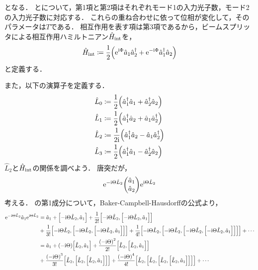 \documentclass{report}
\begin{document}
    となる．
    とについて，第1項と第2項はそれぞれモード1の入力光子数，モード2の入力光子数に対応する．
    これらの重ね合わせに依って位相が変化して，そのパラメータは$T$である．
    相互作用を表す項は第3項であるから，ビームスプリッタによる相互作用ハミルトニアン$\hat{H}_{\mathrm{int}}$を，
    \begin{align}
      \hat{H}_{\mathrm{int}} \coloneqq \frac{1}{2}\qty(\mathrm{e}^{\mathrm{i}\Phi}\hat{a}_1\hat{a}_2^{\dag} + \mathrm{e}^{-\mathrm{i}\Phi}\hat{a}_1^{\dag}\hat{a}_2)
    \end{align}
    と定義する．
    \par
    また，以下の演算子を定義する．
    \begin{align}
      \hat{L}_0 &\coloneqq \frac{1}{2}\qty(\hat{a}_1^{\dag}\hat{a}_1 + \hat{a}_2^{\dag}\hat{a}_2) \\ 
      \hat{L}_1 &\coloneqq \frac{1}{2}\qty(\hat{a}_1^{\dag}\hat{a}_2 + \hat{a}_1\hat{a}_2^{\dag}) \\ 
      \hat{L}_2 &\coloneqq \frac{1}{2\mathrm{i}}\qty(\hat{a}_1^{\dag}\hat{a}_2 - \hat{a}_1\hat{a}_2^{\dag}) \\ 
      \hat{L}_3 &\coloneqq \frac{1}{2}\qty(\hat{a}_1^{\dag}\hat{a}_1 - \hat{a}_2^{\dag}\hat{a}_2) 
    \end{align}
    $\hat{L}_2$と$\hat{H}_{\mathrm{int}}$の関係を調べよう．
    唐突だが，
    \begin{align}
      \e^{-\i\Theta\hat{L}_2}\mqty(\hat{a}_1 \\ \hat{a}_2)\e^{\i\Theta\hat{L}_2} \label{ml2a1a2ml2}
    \end{align}
    考える．
    の第1成分について，Baker-Campbell-Hausdorffの公式より，
    \begin{align}
      \mathrm{e}^{-\mathrm{i}\Theta\hat{L}_2}\hat{a}_1\mathrm{e}^{\mathrm{i}\Theta\hat{L}_2} &= \hat{a}_1 + \qty[-\mathrm{i}\Theta\hat{L}_2, \hat{a}_1] + \frac{1}{2!}\qty[-\mathrm{i}\Theta\hat{L}_2, \qty[-\mathrm{i}\Theta\hat{L}_2, \hat{a}_1]] \notag\\ 
      &+ \frac{1}{3!}\qty[-\mathrm{i}\Theta\hat{L}_2, \qty[-\mathrm{i}\Theta\hat{L}_2, \qty[-\mathrm{i}\Theta\hat{L}_2, \hat{a}_1]]] + \frac{1}{4!}\qty[-\mathrm{i}\Theta\hat{L}_2, \qty[-\mathrm{i}\Theta\hat{L}_2, \qty[-\mathrm{i}\Theta\hat{L}_2, \qty[-\mathrm{i}\Theta\hat{L}_2, \hat{a}_1]]]] + \cdots \\ 
      &= \hat{a}_1 + \qty(-\mathrm{i}\Theta)\qty[\hat{L}_2, \hat{a}_1] + \frac{\qty(-\mathrm{i}\Theta)^2}{2!}\qty[\hat{L}_2, \qty[\hat{L}_2, \hat{a}_1]]\notag \\ 
      &+ \frac{\qty(-\mathrm{i}\Theta)^3}{3!}\qty[\hat{L}_2, \qty[\hat{L}_2, \qty[\hat{L}_2, \hat{a}_1]]] + \frac{\qty(-\mathrm{i}\Theta)^4}{4!}\qty[\hat{L}_2, \qty[\hat{L}_2, \qty[\hat{L}_2, \qty[\hat{L}_2, \hat{a}_1]]]] + \cdots \label{etl2-a1}
    \end{align}
\end{document}
